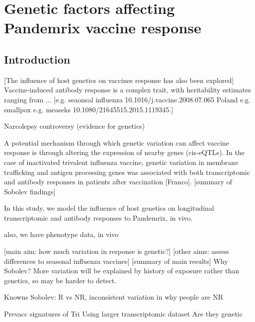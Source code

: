 %
%

\chapter{Genetic factors affecting Pandemrix vaccine response}

\section{Introduction}


[The influence of host genetics on vaccines response has also been explored]
Vaccine-induced antibody response is a complex trait, with heritability estimates ranging from ... [e.g. seaonsal influenza 10.1016/j.vaccine.2008.07.065 Poland e.g. smallpox e.g. measeks 10.1080/21645515.2015.1119345.]

Narcolepsy controversy (evidence for genetics)

A potential mechanism through which genetic variation can affect vaccine response is through altering the expression of nearby genes (cis-eQTLs).
In the case of inactivated trivalent influenza vaccine, genetic variation in membrane trafficking and antigen processing genes was associated with both transcriptomic and antibody responses in patients after vaccination [Franco].
[summary of Sobolev findings]


In this study, we model the influence of host genetics on longitudinal transcriptomic and antibody responses to Pandemrix, in vivo.

also, we have phenotype data, in vivo

[main aim: how much variation in response is genetic?]
[other aims: assess differences to seasonal influenza vaccines]
[summary of main results]
Why Sobolev?
More variation will be explained by history of exposure rather than genetics, so may be harder to detect.

Knowns
    Sobolev: R vs NR, 
    inconsistent variation in why people are NR

Prevacc signatures of Tri
Using larger transcriptomic dataset
Are they genetic

